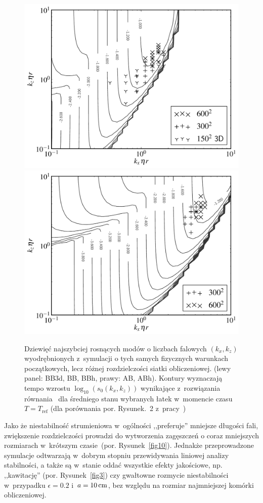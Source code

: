 \begin{figure}
  \includegraphics[width=0.48\linewidth]{figures/fig9a}
  \includegraphics[width=0.48\linewidth]{figures/fig9b}
  \caption[Ewolucja najszybciej rosnących modów niestabilności strumieniowej w
  symulacjach BB3d, BB, BBh oraz AB, ABh.]
    {Dziewięć najszybciej rosnących modów o liczbach falowych $(k_x, k_z)$
     wyodrębnionych z~symulacji o tych samych fizycznych warunkach początkowych,
     lecz różnej rozdzielczości siatki obliczeniowej. (lewy panel: BB3d, BB,
     BBh, prawy: AB, ABh). Kontury wyznaczają tempo wzrostu $\log_{10}( s_0(k_x,
  k_z))$ wynikające z~rozwiązania równania~  dla średniego
  stanu wybranych łatek w~momencie czasu  $T = T_{\textrm{ref}}$ (dla porównania
  por. Rysunek.~2 z~pracy~\cite{YG05})}
   \label{fig9}
\end{figure}
%
\par Jako że niestabilność strumieniowa w~ogólności ,,preferuje'' mniejsze
długości fali, zwiększenie rozdzielczości prowadzi do wytworzenia
 zagęszczeń o coraz mniejszych rozmiarach w~krótszym czasie~(por.
Rysunek~\ref{fig10}).  Jednakże przeprowadzone symulacje odtwarzają w~dobrym
stopniu przewidywania liniowej analizy stabilności, a także są w~stanie oddać
wszystkie efekty jakościowe, np. ,,kawitację'' (por. Rysunek~\ref{fig3}) czy
gwałtowne rozmycie niestabilności w~przypadku $\epsilon=0.2$ i~$a=10\hbox{$\thinspace\textrm{cm}$}$, bez
względu na rozmiar najmniejszej komórki obliczeniowej.

